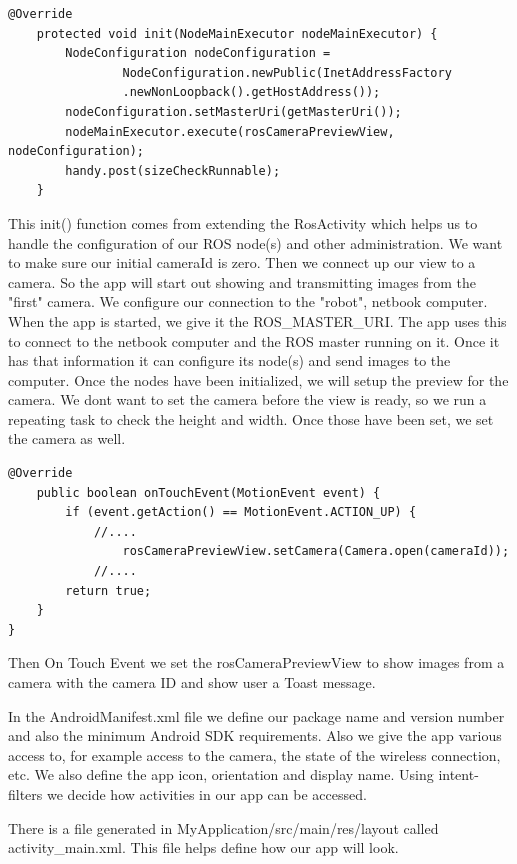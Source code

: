 \documentclass[10pt,a4paper]{article}
\begin{document}
\newpage
\begin{lstlisting}[frame=single] 
 @Override
    protected void init(NodeMainExecutor nodeMainExecutor) {
        NodeConfiguration nodeConfiguration =
                NodeConfiguration.newPublic(InetAddressFactory
                .newNonLoopback().getHostAddress());
        nodeConfiguration.setMasterUri(getMasterUri());
        nodeMainExecutor.execute(rosCameraPreviewView, nodeConfiguration);
        handy.post(sizeCheckRunnable);
    }
\end{lstlisting}

This init() function comes from extending the RosActivity which helps us to handle the configuration of our ROS node(s) and other administration. We want to make sure our initial cameraId is zero. Then we connect up our view to a camera. So the app will start out showing and transmitting images from the "first" camera. We configure our connection to the "robot", netbook computer. When the app is started, we give it the ROS\_MASTER\_URI. The app uses this to connect to the netbook computer and the ROS master running on it. Once it has that information it can configure its node(s) and send images to the computer. Once the nodes have been initialized, we will setup the preview for the camera. We dont want to set the camera before the view is ready, so we run a repeating task to check the height and width. Once those have been set, we set the camera as well.

\begin{lstlisting}[frame=single] 
 @Override
    public boolean onTouchEvent(MotionEvent event) {
        if (event.getAction() == MotionEvent.ACTION_UP) {
            //....
                rosCameraPreviewView.setCamera(Camera.open(cameraId));
            //....    
        return true;
    }
}
\end{lstlisting}

Then On Touch Event we set the rosCameraPreviewView to show images from a camera with the camera ID and show user a Toast message.

In the AndroidManifest.xml file we define our package name and version number and also the minimum Android SDK requirements. Also we give the app various access to, for example access to the camera, the state of the wireless connection, etc. We also define the app icon, orientation and display name. Using intent-filters we decide how activities in our app can be accessed.

There is a file generated in MyApplication/src/main/res/layout called activity\_main.xml. This file helps define how our app will look.\\\\
\end{document}
